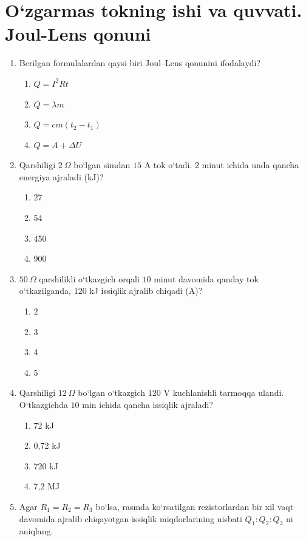 \section{O`zgarmas tokning ishi va quvvati. Joul-Lens qonuni}


\begin{enumerate}

\item Berilgan formulalardan qaysi biri Joul–Lens qonunini ifodalaydi? 
\begin{enumerate}[label=\Alph*)]
\item $Q = I^2Rt$
\item $Q = \lambda m$
\item $Q = cm(t_2 - t_1)$
\item $Q = A + \Delta U$
\end{enumerate}

\item Qarshiligi $2~\Omega$ bo‘lgan simdan $15$ A tok o‘tadi. $2$ minut ichida unda qancha energiya ajraladi (kJ)? 
\begin{enumerate}[label=\Alph*)]
\item 27
\item 54
\item 450
\item 900
\end{enumerate}

\item $50~\Omega$ qarshilikli o‘tkazgich orqali $10$ minut davomida qanday tok o‘tkazilganda, $120$ kJ issiqlik ajralib chiqadi (A)?
\begin{enumerate}[label=\Alph*)]
\item 2
\item 3
\item 4
\item 5
\end{enumerate}

\item Qarshiligi $12~\Omega$ bo‘lgan o‘tkazgich $120$ V kuchlanishli tarmoqqa ulandi. O‘tkazgichda $10$ min ichida qancha issiqlik ajraladi?
\begin{enumerate}[label=\Alph*)]
\item 72 kJ
\item 0,72 kJ
\item 720 kJ
\item 7,2 MJ
\end{enumerate}

\item Agar $R_1 = R_2 = R_3$ bo‘lsa, rasmda ko‘rsatilgan rezistorlardan bir xil vaqt davomida ajralib chiqayotgan issiqlik miqdorlarining nisbati $Q_1 : Q_2 : Q_3$ ni aniqlang.


\end{enumerate}
